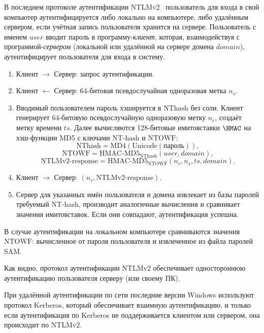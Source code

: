 В последнем протоколе аутентификации NTLMv2~\cite{MS-NLMP} пользователь для входа в свой компьютер аутентифицируется либо локально на компьютере, либо удалённым сервером, если учётная запись пользователя хранится на сервере. Пользователь с именем $user$ вводит пароль в программу-\emph{клиент}, которая, взаимодействуя с программой-\emph{сервером} (локальной или удалённой на сервере домена $domain$), аутентифицирует пользователя для входа в систему.
\begin{enumerate}
    \item Клиент $\rightarrow$ Сервер: запрос аутентификации.
    \item Клиент $\leftarrow$ Сервер: 64-битовая псевдослучайная одноразовая метка $n_s$.
    \item Вводимый пользователем пароль хэшируется в $\textrm{NThash}$ без соли. Клиент генерирует 64-битовую псевдослучайную одноразовую метку $n_c$, создаёт метку времени $ts$. Далее вычисляются 128-битовые имитовставки $\HMAC$ на хэш-функции MD5 с ключами $\textrm{NT-hash}$ и $\textrm{NTOWF}$:
        \[ \textrm{NThash} = \text{MD4}(\text{Unicode}(\text{пароль})), \]
        \[ \textrm{NTOWF} = \textrm{HMAC-MD5}_{\textrm{NThash}}(user, domain), \]
        \[ \textrm{NTLMv2-response} = \textrm{HMAC-MD5}_{\textrm{NTOWF}}(n_c, n_s, ts, domain). \]
    \item Клиент $\rightarrow$ Сервер: $(n_c, \textrm{NTLMv2-response})$. %
    \item Сервер для указанных имён пользователя и домена извлекает из базы паролей требуемый NT-hash, производит аналогичные вычисления и сравнивает значения имитовставок. Если они совпадают, аутентификация успешна.
\end{enumerate}

В случае аутентификации на локальном компьютере сравниваются значения $\textrm{NTOWF}$: вычисленное от пароля пользователя и извлеченное из файла паролей SAM.

Как видно, протокол аутентификации NTLMv2 обеспечивает одностороннюю аутентификацию пользователя серверу (или своему ПК).

При удалённой аутентификации по сети последние версии Windows используют протокол Kerberos, который обеспечивает взаимную аутентификацию, и только если аутентификация по Kerberos не поддерживается клиентом или сервером, она происходит по NTLMv2.
